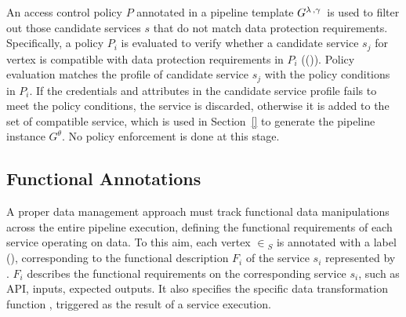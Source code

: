 An access control policy $P$ annotated in a pipeline template $G^{\lambda\,,\gamma\,}$ is used to filter out those candidate services $s$ that do not match data protection requirements. Specifically, a policy $P_i$ is evaluated to verify whether a candidate service $s_j$ for vertex  is compatible with data protection requirements in $P_i$ (\myLambda()). Policy evaluation matches the profile of candidate service $s_j$ with the policy conditions in $P_i$. If the credentials and attributes in the candidate service profile fails to meet the policy conditions, the service is discarded, otherwise it is added to the set of compatible service, which is used in Section~\ref{} to generate the pipeline instance $G^{\theta}$. No policy enforcement is done at this stage.

\subsection{Functional Annotations}\label{sec:funcannotation}
A proper data management approach must track functional data manipulations across the entire pipeline execution, defining the functional requirements of each service operating on data.
To this aim, each vertex $\in$\V$_S$ is annotated with a label \myGamma(), corresponding to the functional description $F_i$ of the service $s_i$ represented by .
$F_i$ describes the functional requirements on the corresponding service $s_i$, such as API, inputs, expected outputs.
It also specifies the specific data transformation function \TF{}, triggered as the result of a service execution. %

